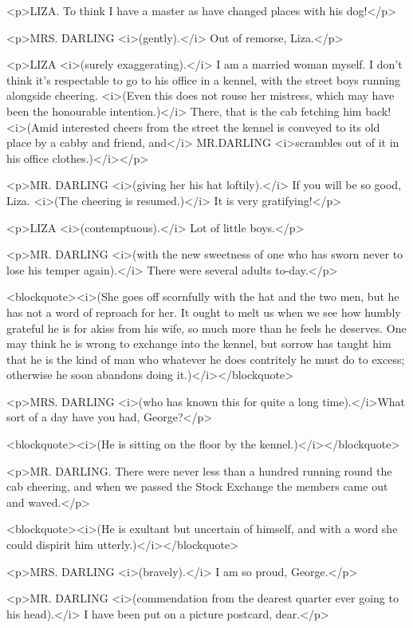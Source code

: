 <p>LIZA. To think I have a master as have changed places with his
dog!</p>

<p>MRS. DARLING <i>(gently).</i> Out of remorse, Liza.</p>

<p>LIZA <i>(surely exaggerating).</i> I am a married woman myself. I
don't think it's respectable to go to his office in a kennel, with
the street boys running alongside cheering. <i>(Even this does not
rouse her mistress, which may have been the honourable
intention.)</i> There, that is the cab fetching him back! <i>(Amid
interested cheers from the street the kennel is conveyed to its old
place by a cabby and friend, and</i> MR.DARLING <i>scrambles out of
it in his office clothes.)</i></p>

<p>MR. DARLING <i>(giving her his hat loftily).</i> If you will be so
good, Liza. <i>(The cheering is resumed.)</i> It is very
gratifying!</p>

<p>LIZA <i>(contemptuous).</i> Lot of little boys.</p>

<p>MR. DARLING <i>(with the new sweetness of one who has sworn never
to lose his temper again).</i> There were several adults to-day.</p>

<blockquote><i>(She goes off scornfully with the hat and the two men,
but he has not a word of reproach for her. It ought to melt us when
we see how humbly grateful he is for akiss from his wife, so much
more than he feels he deserves. One may think he is wrong to exchange
into the kennel, but sorrow has taught him that he is the kind of man
who whatever he does contritely he must do to excess; otherwise he
soon abandons doing it.)</i></blockquote>

<p>MRS. DARLING <i>(who has known this for quite a long
time).</i>What sort of a day have you had, George?</p>

<blockquote><i>(He is sitting on the floor by the
kennel.)</i></blockquote>

<p>MR. DARLING. There were never less than a hundred running round
the cab cheering, and when we passed the Stock Exchange the members
came out and waved.</p>

<blockquote><i>(He is exultant but uncertain of himself, and with a
word she could dispirit him utterly.)</i></blockquote>

<p>MRS. DARLING <i>(bravely).</i> I am so proud, George.</p>

<p>MR. DARLING <i>(commendation from the dearest quarter ever going
to his head).</i> I have been put on a picture postcard, dear.</p>

